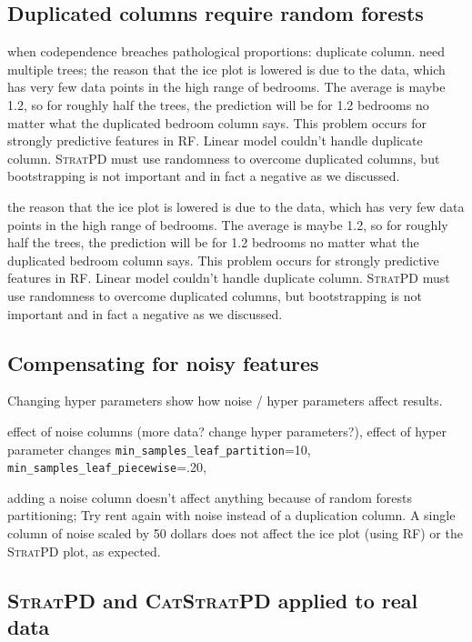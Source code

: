 \documentclass[12pt]{article}
\newcommand{\spd}{\fontfamily{cmr}\textsc{\small StratPD}}
\newcommand{\cspd}{\fontfamily{cmr}\textsc{\small CatStratPD}}
\begin{document}
\subsection{Duplicated columns require random forests}\label{sec:dup}

when codependence breaches pathological proportions: duplicate column. need multiple trees; the reason that the ice plot is lowered is due to the data, which has very few data points in the high range of bedrooms. The average is maybe 1.2, so for roughly half the trees, the prediction will be for 1.2 bedrooms no matter what the duplicated bedroom column says.  This problem occurs for strongly predictive features in RF. Linear model couldn't handle duplicate column. \spd{} must use randomness to overcome duplicated columns, but bootstrapping is not important and in fact a negative as we discussed.

the reason that the ice plot is lowered is due to the data, which has very few data points in the high range of bedrooms. The average is maybe 1.2, so for roughly half the trees, the prediction will be for 1.2 bedrooms no matter what the duplicated bedroom column says.  This problem occurs for strongly predictive features in RF. Linear model couldn't handle duplicate column. \spd{} must use randomness to overcome duplicated columns, but bootstrapping is not important and in fact a negative as we discussed. 

\subsection{Compensating for noisy features}\label{sec:noise}

Changing hyper parameters
show how noise /  hyper parameters affect results.

effect of noise columns (more data? change hyper parameters?), effect of hyper parameter changes
                 {\tt min\_samples\_leaf\_partition}=10,
                 {\tt min\_samples\_leaf\_piecewise}=.20,

adding a noise column doesn't affect anything because of random forests partitioning; Try rent again with noise instead of a duplication column. A single column of noise scaled by 50 dollars does not affect the ice plot (using RF) or the \spd{} plot, as expected.

\subsection{\spd{} and \cspd{} applied to real data} 
\end{document}
